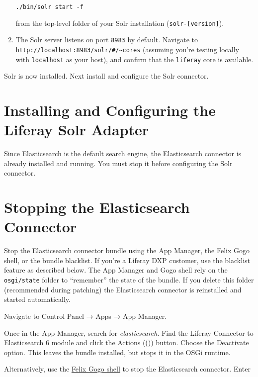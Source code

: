 \begin{enumerate}
\begin{verbatim}
./bin/solr start -f
\end{verbatim}

  from the top-level folder of your Solr installation
  (\texttt{solr-{[}version{]}}).
\item
  The Solr server listens on port \texttt{8983} by default. Navigate to
  \texttt{http://localhost:8983/solr/\#/\textasciitilde{}cores}
  (assuming you're testing locally with \texttt{localhost} as your
  host), and confirm that the \texttt{liferay} core is available.
\end{enumerate}

Solr is now installed. Next install and configure the Solr connector.

\section{Installing and Configuring the Liferay Solr
Adapter}\label{installing-and-configuring-the-liferay-solr-adapter}

Since Elasticsearch is the default search engine, the Elasticsearch
connector is already installed and running. You must stop it before
configuring the Solr connector.

\section{Stopping the Elasticsearch
Connector}\label{stopping-the-elasticsearch-connector}

Stop the Elasticsearch connector bundle using the App Manager, the Felix
Gogo shell, or the bundle blacklist. If you're a Liferay DXP customer,
use the blacklist feature as described below. The App Manager and Gogo
shell rely on the \texttt{osgi/state} folder to ``remember'' the state
of the bundle. If you delete this folder (recommended during patching)
the Elasticsearch connector is reinstalled and started automatically.

Navigate to Control Panel → Apps → App Manager.

Once in the App Manager, search for \emph{elasticsearch}. Find the
Liferay Connector to Elasticsearch 6 module and click the Actions
(())
button. Choose the Deactivate option. This leaves the bundle installed,
but stops it in the OSGi runtime.

Alternatively, use the
\href{/developer/tutorials/-/knowledge_base/7-2/using-the-felix-gogo-shell}{Felix
Gogo shell} to stop the Elasticsearch connector. Enter

